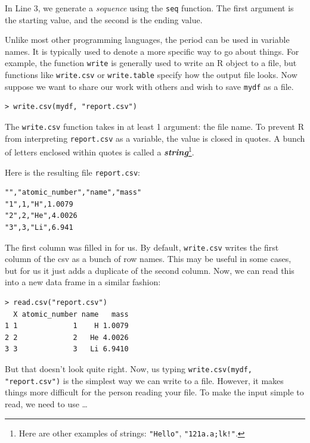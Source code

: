 \documentclass[12pt]{article}
\theoremstyle{remark}
\newcommand{\vocab}[1]{\textbf{\emph{#1}}}
\begin{document}
In Line 3, we generate a \emph{sequence} using the \verb|seq| function. The first argument is the starting value, and the second is the ending value.

Unlike most other programming languages, the period can be used in variable names. It is typically used to denote a more specific way to go about things. For example, the function \verb|write| is generally used to write an R object to a file, but functions like \verb|write.csv| or \verb|write.table| specify how the output file looks. Now suppose we want to share our work with others and wish to save \verb|mydf| as a file.

\begin{verbatim}
> write.csv(mydf, "report.csv")
\end{verbatim}

The \verb|write.csv| function takes in at least 1 argument: the file name. To prevent R from interpreting \verb|report.csv| as a variable, the value is closed in quotes. A bunch of letters enclosed within quotes is called a \vocab{string}\footnote{Here are other examples of strings: \texttt{"Hello"}, \texttt{"121a.a;lk!"}.}.

Here is the resulting file \verb|report.csv|:
\begin{verbatim}
"","atomic_number","name","mass"
"1",1,"H",1.0079
"2",2,"He",4.0026
"3",3,"Li",6.941
\end{verbatim}
The first column was filled in for us. By default, \verb|write.csv| writes the first column of the csv as a bunch of row names. This may be useful in some cases, but for us it just adds a duplicate of the second column. Now, we can read this into a new data frame in a similar fashion:

\begin{verbatim}
> read.csv("report.csv")
  X atomic_number name   mass
1 1             1    H 1.0079
2 2             2   He 4.0026
3 3             3   Li 6.9410
\end{verbatim}

But that doesn't look quite right. Now, us typing \verb|write.csv(mydf, "report.csv")| is the simplest way we can write to a file. However, it makes things more difficult for the person reading your file. To make the input simple to read, we need to use \dots
\end{document}
